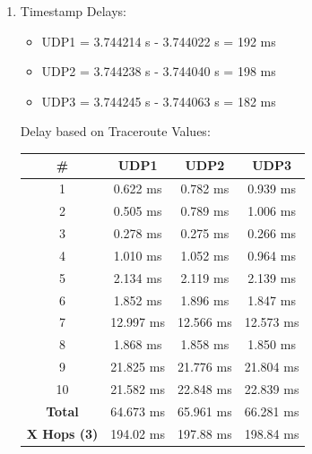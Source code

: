 \documentclass[11pt]{article}
\begin{document}
\begin{enumerate}
\item
Timestamp Delays:
\begin{itemize}
\item{UDP1 = 3.744214 s - 3.744022 s = 192 ms}
\item{UDP2 = 3.744238 s - 3.744040 s = 198 ms}
\item{UDP3 = 3.744245 s - 3.744063 s = 182 ms}
\end{itemize}

Delay based on Traceroute Values:
\begin{center}
\begin{tabular}{|c|c|c|c|}
\hline
\textbf{\#} & \textbf{UDP1} & \textbf{UDP2} & \textbf{UDP3} \\
\hline
1 & 0.622 ms & 0.782 ms & 0.939 ms \\
\hline
2 & 0.505 ms & 0.789 ms & 1.006 ms \\
\hline
3 & 0.278 ms & 0.275 ms & 0.266 ms \\
\hline
4 & 1.010 ms & 1.052 ms & 0.964 ms \\
\hline
5 & 2.134 ms & 2.119 ms & 2.139 ms \\
\hline
6 & 1.852 ms & 1.896 ms & 1.847 ms \\
\hline
7 & 12.997 ms & 12.566 ms & 12.573 ms \\
\hline
8 & 1.868 ms & 1.858 ms & 1.850 ms \\
\hline
9 & 21.825 ms & 21.776 ms & 21.804 ms \\
\hline
10 & 21.582 ms & 22.848 ms & 22.839 ms \\
\hline
\textbf{Total} & 64.673 ms & 65.961 ms & 66.281 ms \\
\hline
\textbf{\textbf{X Hops (3)}} & 194.02 ms & 197.88 ms & 198.84 ms \\
\hline
\end{tabular}
\end{center}


\end{enumerate}
\end{document}
